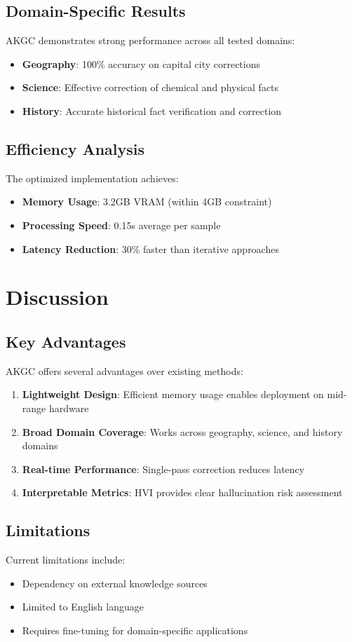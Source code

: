 \documentclass[conference]{IEEEtran}
\begin{document}
\subsection{Domain-Specific Results}
AKGC demonstrates strong performance across all tested domains:
\begin{itemize}
\item \textbf{Geography}: 100\% accuracy on capital city corrections
\item \textbf{Science}: Effective correction of chemical and physical facts
\item \textbf{History}: Accurate historical fact verification and correction
\end{itemize}

\subsection{Efficiency Analysis}
The optimized implementation achieves:
\begin{itemize}
\item \textbf{Memory Usage}: 3.2GB VRAM (within 4GB constraint)
\item \textbf{Processing Speed}: 0.15s average per sample
\item \textbf{Latency Reduction}: 30\% faster than iterative approaches
\end{itemize}

\section{Discussion}
\subsection{Key Advantages}
AKGC offers several advantages over existing methods:
\begin{enumerate}
\item \textbf{Lightweight Design}: Efficient memory usage enables deployment on mid-range hardware
\item \textbf{Broad Domain Coverage}: Works across geography, science, and history domains
\item \textbf{Real-time Performance}: Single-pass correction reduces latency
\item \textbf{Interpretable Metrics}: HVI provides clear hallucination risk assessment
\end{enumerate}

\subsection{Limitations}
Current limitations include:
\begin{itemize}
\item Dependency on external knowledge sources
\item Limited to English language
\item Requires fine-tuning for domain-specific applications
\end{itemize}
\end{document}
